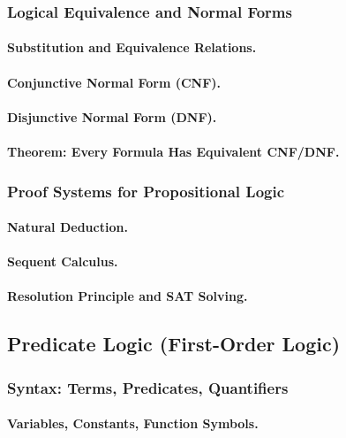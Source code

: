 \subsubsection{Logical Equivalence and Normal Forms}
\paragraph{Substitution and Equivalence Relations.}
\paragraph{Conjunctive Normal Form (CNF).}
\paragraph{Disjunctive Normal Form (DNF).}
\paragraph{Theorem: Every Formula Has Equivalent CNF/DNF.}

\subsubsection{Proof Systems for Propositional Logic}
\paragraph{Natural Deduction.}
\paragraph{Sequent Calculus.}
\paragraph{Resolution Principle and SAT Solving.}

\subsection{Predicate Logic (First-Order Logic)}
\label{subsec:predicate-logic}

\subsubsection{Syntax: Terms, Predicates, Quantifiers}
\paragraph{Variables, Constants, Function Symbols.}
